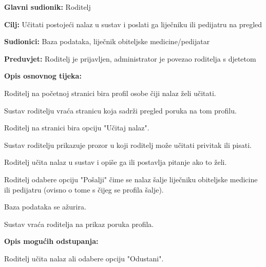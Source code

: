 				
					
					\noindent {}
					\begin{packed_item}
						
						\item \textbf{Glavni sudionik: }Roditelj
						\item  \textbf{Cilj:} Učitati postojeći nalaz u sustav i poslati ga liječniku ili pedijatru na pregled
						\item  \textbf{Sudionici:} Baza podataka, liječnik obiteljske medicine/pedijatar
						\item  \textbf{Preduvjet:} Roditelj je prijavljen, administrator je povezao roditelja s djetetom
						\item  \textbf{Opis osnovnog tijeka:}
						
						\item[] \begin{packed_enum}
							
							\item Roditelj na početnoj stranici bira profil osobe čiji nalaz želi učitati.
							\item Sustav roditelju vraća stranicu koja sadrži pregled poruka na tom profilu.
							\item Roditelj na stranici bira opciju "Učitaj nalaz".
							\item Sustav roditelju prikazuje prozor u koji roditelj može učitati privitak ili pisati.
							\item Roditelj učita nalaz u sustav i opiše ga ili postavlja pitanje ako to želi.
							\item Roditelj odabere opciju "Pošalji" čime se nalaz šalje liječniku obiteljske medicine ili pedijatru (ovisno o tome s čijeg se profila šalje).
							\item Baza podataka se ažurira.
							\item Sustav vraća roditelja na prikaz poruka profila.
						\end{packed_enum}
						
						\item  \textbf{Opis mogućih odstupanja:}
						
						\item[] \begin{packed_item}
							
							\item[6.a] Roditelj učita nalaz ali odabere opciju "Odustani".
							\item[] \begin{packed_enum}
								

\end{packed_enum}
\end{packed_item}
\end{packed_item}
